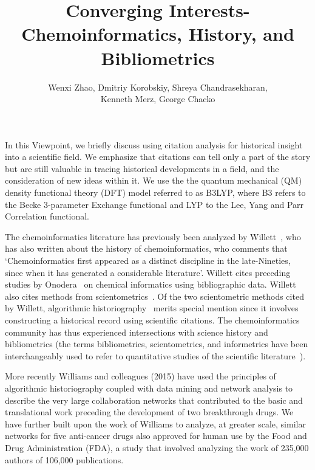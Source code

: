 \documentclass[11pt, oneside]{article}   	%
\title{Converging Interests- Chemoinformatics, History, and Bibliometrics}
\author{Wenxi Zhao, Dmitriy Korobskiy, Shreya Chandrasekharan, \\Kenneth Merz, George Chacko}
\begin{document}
\maketitle

In this Viewpoint, we briefly discuss using citation analysis for historical insight into a scientific field. We emphasize that citations can tell only a part of the story but are still valuable in tracing historical developments in a field, and the consideration of new ideas within it. We use the the quantum mechanical (QM) density functional theory (DFT) model referred to as B3LYP, where B3 refers to the Becke 3-parameter Exchange functional and LYP to the Lee, Yang and Parr Correlation functional.

 The chemoinformatics literature has previously been analyzed by Willett~\citep{willett2008}, who has also written about the history of chemoinformatics\citep{willett2003}, who comments that  `Chemoinformatics first appeared as a distinct discipline in the late-Nineties, since when it has generated a considerable literature'. Willett cites preceding studies by Onodera~\citep{onodera2001,onodera2003} on chemical informatics using bibliographic data. Willett also cites methods from scientometrics~\citep{garfield2004,leydesdorff2007}.  Of the two scientometric methods cited by Willett, algorithmic historiography~\citep{garfield2004} merits special mention since it involves constructing a historical record using scientific citations. The chemoinformatics community has thus experienced intersections with science history and bibliometrics (the terms bibliometrics, scientometrics, and informetrics have been interchangeably used to refer to quantitative studies of the scientific literature~\citep{debellis2009}).
 
More recently Williams and colleagues (2015)\citep{williams2015scientific} have used the principles of algorithmic historiography coupled with data mining and network analysis to describe the very large collaboration networks that contributed to the basic and translational work preceding the development of two breakthrough drugs. We\citep{keserci2017research} have further built upon the work of Williams to analyze, at greater scale, similar networks for five anti-cancer drugs also approved for human use by the Food and Drug Administration (FDA), a study that involved analyzing the work of 235,000 authors of 106,000 publications.
\end{document}
